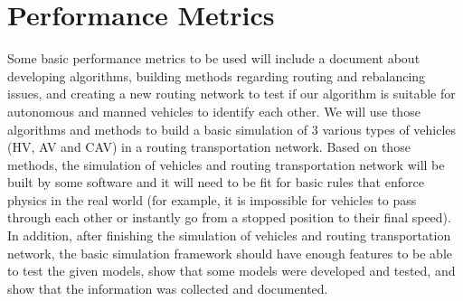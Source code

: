 \documentclass[onecolumn, draftclsnofoot,10pt, compsoc]{IEEEtran}
\begin{document}
\section{Performance Metrics}
Some basic performance metrics to be used will include a document about developing algorithms, building methods regarding routing and rebalancing issues, and creating a new routing network to test if our algorithm is suitable for autonomous and manned vehicles to identify each other.
We will use those algorithms and methods to build a basic simulation of 3 various types of vehicles (HV, AV and CAV) in a routing transportation network.
Based on those methods, the simulation of vehicles and routing transportation network will be built by some software and it will need to be fit for basic rules that enforce physics in the real world (for example, it is impossible for vehicles to pass through each other or instantly go from a stopped position to their final speed).
In addition, after finishing the simulation of vehicles and routing transportation network, the basic simulation framework should have enough features to be able to test the given models, show that some models were developed and tested, and show that the information was collected and documented.
\end{document}
